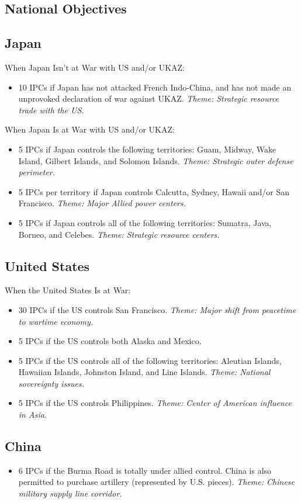 \documentclass[10pt,a4paper,landscape]{article}
\begin{document}
\begin{multicols*}{3}
\columnbreak

\section*{National Objectives}
\subsection*{Japan}
When Japan Isn't at War with US and/or UKAZ:
\begin{itemize}
\item 10 IPCs if Japan has not attacked French Indo-China, and has not made an unprovoked declaration of war against UKAZ. \textsl{Theme: Strategic resource trade with the US.}
\end{itemize}
When Japan Is at War with US and/or UKAZ:
\begin{itemize}
\item 5 IPCs if Japan controls the following territories: Guam, Midway, Wake Island, Gilbert Islands, and Solomon Islands. \textsl{Theme: Strategic outer defense perimeter.}
\item 5 IPCs per territory if Japan controls Calcutta, Sydney, Hawaii and/or San Francisco. \textsl{Theme: Major Allied power centers.}
\item 5 IPCs if Japan controls all of the following territories: Sumatra, Java, Borneo, and Celebes. \textsl{Theme: Strategic resource centers.}
\end{itemize}

\subsection*{United States}
When the United States Is at War:
\begin{itemize}
\item 30 IPCs if the US controls San Francisco. \textsl{Theme: Major shift from peacetime to wartime economy.}
\item 5 IPCs if the US controls both Alaska and Mexico.
\item 5 IPCs if the US controls all of the following territories: Aleutian Islands, Hawaiian Islands, Johnston Island, and Line Islands. \textsl{Theme: National sovereignty issues.}
\item 5 IPCs if the US controls Philippines. \textsl{Theme: Center of American influence in Asia.}
\end{itemize}

\subsection*{China}
\begin{itemize}
\item 6 IPCs if the Burma Road is totally under allied control. China is also permitted to purchase artillery (represented by U.S. pieces). \textsl{Theme: Chinese military supply line corridor.}
\end{itemize}


\end{multicols*}
\end{document}

